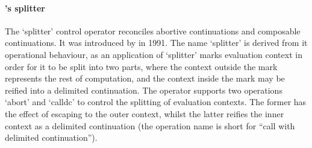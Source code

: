 \documentclass[12pt,phd,lfcs,twoside,openright,logo,leftchapter,normalheadings]{infthesis}
\theoremstyle{plain}
\theoremstyle{definition}
\begin{document}

%

\paragraph{\citeauthor{QueinnecS91}'s splitter} The `splitter' control
operator reconciles abortive continuations and composable
continuations. It was introduced by \citet{QueinnecS91} in 1991. The
name `splitter' is derived from it operational behaviour, as an
application of `splitter' marks evaluation context in order for it to
be split into two parts, where the context outside the mark represents
the rest of computation, and the context inside the mark may be
reified into a delimited continuation. The operator supports two
operations `abort' and `calldc' to control the splitting of evaluation
contexts. The former has the effect of escaping to the outer context,
whilst the latter reifies the inner context as a delimited
continuation (the operation name is short for ``call with delimited
continuation'').
\end{document}

